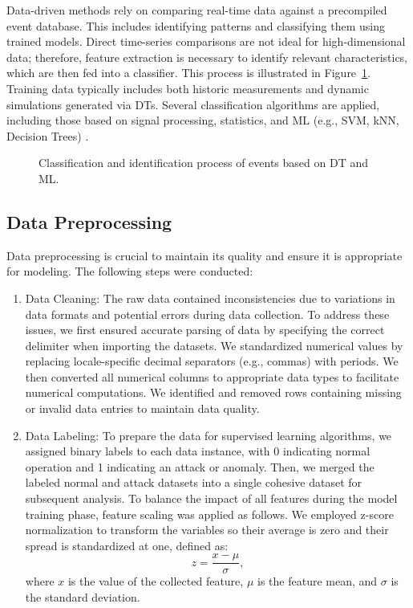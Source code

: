 Data-driven methods rely on comparing real-time data against a precompiled event database. This includes identifying patterns and classifying them using trained models. Direct time-series comparisons are not ideal for high-dimensional data; therefore, feature extraction is necessary to identify relevant characteristics, which are then fed into a classifier. This process is illustrated in Figure~\cref{fig:dt_ml_idnt}. Training data typically includes both historic measurements and dynamic simulations generated via DTs. Several classification algorithms are applied, including those based on signal processing, statistics, and ML (e.g., SVM, kNN, Decision Trees) \autocite{idrisov2025leveragingdigitaltwinmachine}.

\begin{figure}[htbp]
    \caption{Classification and identification process of events based on DT and ML.}\label{fig:dt_ml_idnt}
\end{figure}

\subsection{Data Preprocessing}\label{subsec:ch2/sec3/sub1}

Data preprocessing is crucial to maintain its quality and ensure it is appropriate for modeling. The following steps were conducted:
\begin{enumerate}
    \item Data Cleaning: The raw data contained inconsistencies due to variations in data formats and potential errors during data collection. To address these issues, we first ensured accurate parsing of data by specifying the correct delimiter when importing the datasets. We standardized numerical values by replacing locale-specific decimal separators (e.g., commas) with periods. We then converted all numerical columns to appropriate data types to facilitate numerical computations. We identified and removed rows containing missing or invalid data entries to maintain data quality.
    \item Data Labeling: To prepare the data for supervised learning algorithms, we assigned binary labels to each data instance, with 0 indicating normal operation and 1 indicating an attack or anomaly. Then, we merged the labeled normal and attack datasets into a single cohesive dataset for subsequent analysis. To balance the impact of all features during the model training phase, feature scaling was applied as follows. We employed z-score normalization to transform the variables so their average is zero and their spread is standardized at one, defined as:
    \begin{equation}
        z=\frac{x-\mu}{\sigma},
    \end{equation}
    where $x$ is the value of the collected feature, $\mu$ is the feature mean, and $\sigma$ is the standard deviation.
\end{enumerate}

